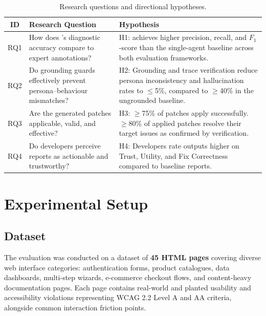 \begin{table}[htbp]
  \centering
  \caption{Research questions and directional hypotheses.}
  \label{tab:hypotheses}
  \begin{tabularx}{\textwidth}{@{}c L{5cm} X@{}}
    \toprule
    \textbf{ID} & \textbf{Research Question} & \textbf{Hypothesis} \\
    \midrule
    RQ1 & How does \versimux{}'s diagnostic accuracy compare to expert annotations? & H1: \versimux{} achieves higher precision, recall, and $F_1$-score than the single-agent baseline across both evaluation frameworks. \\
    \addlinespace
    RQ2 & Do grounding guards effectively prevent persona--behaviour mismatches? & H2: Grounding and trace verification reduce persona inconsistency and hallucination rates to $\leq$5\%, compared to $\geq$40\% in the ungrounded baseline. \\
    \addlinespace
    RQ3 & Are the generated patches applicable, valid, and effective? & H3: $\geq$75\% of patches apply successfully. $\geq$80\% of applied patches resolve their target issues as confirmed by verification. \\
    \addlinespace
    RQ4 & Do developers perceive reports as actionable and trustworthy? & H4: Developers rate \versimux{} outputs higher on Trust, Utility, and Fix Correctness compared to baseline reports. \\
    \bottomrule
  \end{tabularx}
\end{table}


\section{Experimental Setup}
\label{sec:experimental-setup}

\subsection{Dataset}
\label{sec:dataset}

The evaluation was conducted on a dataset of \textbf{45 HTML pages} covering diverse web interface categories: authentication forms, product catalogues, data dashboards, multi-step wizards, e-commerce checkout flows, and content-heavy documentation pages. Each page contains real-world and planted usability and accessibility violations representing WCAG 2.2 Level A and AA criteria, alongside common interaction friction points.

